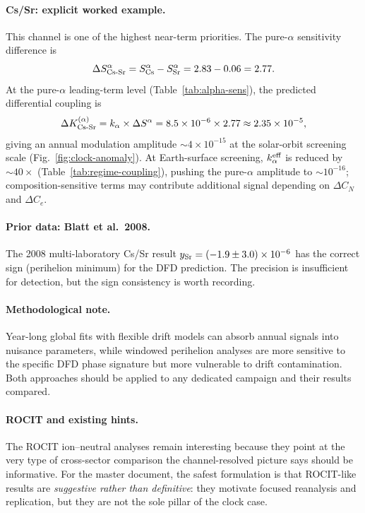 \paragraph{Cs/Sr: explicit worked example.}
This channel is one of the highest near-term priorities.  The pure-$\alpha$ sensitivity difference is
\begin{equation}
\Delta S^\alpha_{\rm Cs\text{-}Sr} = S_{\rm Cs}^\alpha - S_{\rm Sr}^\alpha = 2.83 - 0.06 = 2.77.
\end{equation}
At the pure-$\alpha$ leading-term level (Table~\ref{tab:alpha-sens}), the predicted differential coupling is
\begin{equation}
\Delta K^{(\alpha)}_{\rm Cs\text{-}Sr} = k_\alpha \times \Delta S^\alpha = 8.5 \times 10^{-6} \times 2.77 \approx 2.35 \times 10^{-5},
\end{equation}
giving an annual modulation amplitude ${\sim}4 \times 10^{-15}$ at the solar-orbit screening scale (Fig.~\ref{fig:clock-anomaly}).  At Earth-surface screening, $k_\alpha^{\rm eff}$ is reduced by ${\sim}40\times$ (Table~\ref{tab:regime-coupling}), pushing the pure-$\alpha$ amplitude to ${\sim}10^{-16}$; composition-sensitive terms may contribute additional signal depending on $\Delta C_N$ and $\Delta C_e$.

\paragraph{Prior data: Blatt et al.\ 2008.}
The 2008 multi-laboratory Cs/Sr result $y_{\rm Sr} = (-1.9 \pm 3.0) \times 10^{-6}$ has the correct sign (perihelion minimum) for the DFD prediction.  The precision is insufficient for detection, but the sign consistency is worth recording.

\paragraph{Methodological note.}
Year-long global fits with flexible drift models can absorb annual signals into nuisance parameters, while windowed perihelion analyses are more sensitive to the specific DFD phase signature but more vulnerable to drift contamination.  Both approaches should be applied to any dedicated campaign and their results compared.

\paragraph{ROCIT and existing hints.}
The ROCIT ion--neutral analyses remain interesting because they point at the very type of cross-sector comparison the channel-resolved picture says should be informative.  For the master document, the safest formulation is that ROCIT-like results are \emph{suggestive rather than definitive}: they motivate focused reanalysis and replication, but they are not the sole pillar of the clock case.

